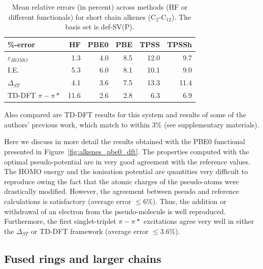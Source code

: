 \documentclass[aip]{revtex4-1}
\begin{document}
\begin{table}[ht]
\caption{Mean relative errors (in percent) across methods (HF or different functionals)
for short chain alkenes  (C\(_{2}\)-C\(_{12}\)).
The basis set is def-SV(P).}
\begin{tabular}{l r r r r r }
\hline \hline
\%-error                & HF & PBE0 & PBE & TPSS & TPSSh \\
\hline
$\varepsilon_{HOMO}$    & 1.3 & 4.0 & 8.5 & 12.0 &  9.7 \\
I.E.                    & 5.3 & 6.0 & 8.1 & 10.1 &  9.0 \\
$\Delta_{ST}$           & 4.1 & 3.6 & 7.5 & 13.3 & 11.4 \\
TD-DFT $\pi-\pi*$       & 11.6 & 2.6 & 2.8 &  6.3 &  6.9 \\ 
\hline\hline
\end{tabular}
\label{table:alkene_errors}
\end{table}

Also compared are TD-DFT results for this system and results of some of the authors' previous work,
which match to within 3\% (see supplementary materials).\cite{drujon_pseudopotentials_2013}

Here we discuss in more detail the results obtained with the PBE0 functional presented
in Figure~\ref{fig:alkenes_pbe0_dft}.
The properties computed with the optimal pseudo-potential are in very good
agreement with the reference values.
The HOMO energy and the ionisation potential are quantities very difficult to reproduce
owing the fact that the atomic charges of the pseudo-atoms were drastically modified.
However, the agreement between pseudo and reference calculations is satisfactory
(average error $\le 6\%$).
Thus, the addition or withdrawal of an electron from the pseudo-molecule is well reproduced.
Furthermore, the first singlet-triplet $\pi-\pi*$ excitations agree very well in either
the $\Delta_{ST}$ or TD-DFT framework (average error $\le 3.6\%$).

\subsection{Fused rings and larger chains}
\end{document}

